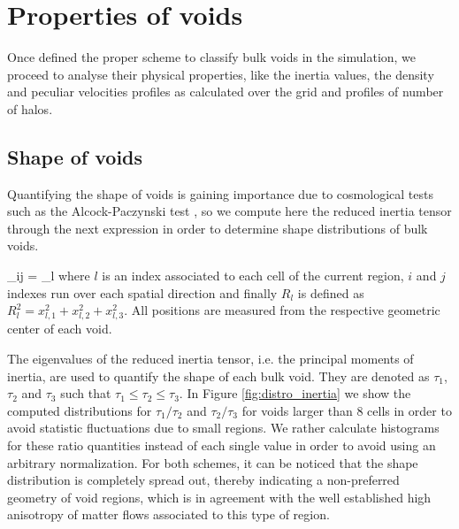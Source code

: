 \documentclass[a4,useAMS,usenatbib,usegraphicx]{latex/mn2e}
\begin{document}
\section{Properties of voids}
\label{sec:properties}


Once defined the proper scheme to classify bulk voids in the simulation,
we proceed to analyse their physical properties, like the inertia values,
the density and peculiar velocities profiles as calculated over the grid 
and profiles of number of halos.


\subsection{Shape of voids}
\label{subsec:shape_voids}


Quantifying the shape of voids is gaining importance due to cosmological 
tests such as the Alcock-Paczynski test , so 
we compute here the reduced inertia tensor through the next expression in 
order to determine shape distributions of bulk voids.


{ \tau_{ij} = \sum_l  }
where $l$ is an index associated to each cell of the current region, 
$i$ and $j$ indexes run over each spatial direction and finally 
$R_l$ is defined as $R_l^2 = x_{l,1}^2 + x_{l,2}^2 + x_{l,3}^2$. All 
positions are measured from the respective geometric center of each void.


The eigenvalues of the reduced inertia tensor, i.e. the principal moments
of inertia, are used to quantify the shape of each bulk void. They are 
denoted as $\tau_1$, $\tau_2$ and $\tau_3$ such that $\tau_1 \leq \tau_2
\leq \tau_3$. In Figure \ref{fig:distro_inertia} we show the computed
distributions for $\tau_1/\tau_2$ and $\tau_2/\tau_3$ for voids larger 
than 8 cells in order to avoid statistic fluctuations due to small regions.
We rather calculate histograms for these ratio quantities instead of each 
single value in order to avoid using an arbitrary normalization. For both 
schemes, it can be noticed that the shape distribution is completely 
spread out, thereby indicating a non-preferred geometry of void regions, 
which is in agreement with the well established high anisotropy of matter 
flows associated to this type of region. 
\end{document}
